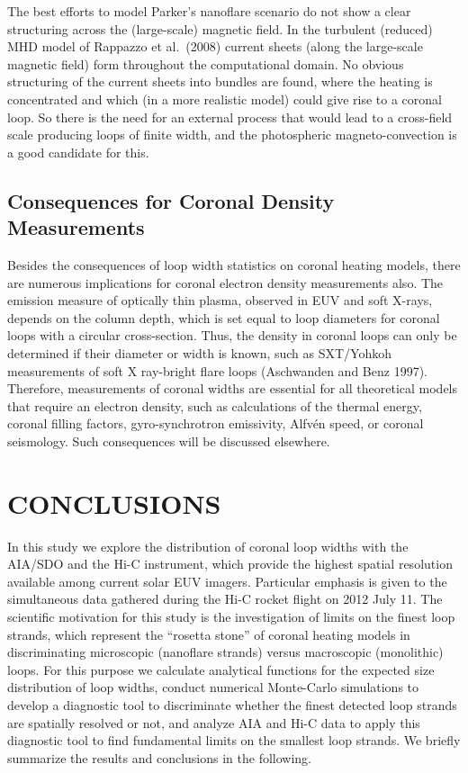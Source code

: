 \documentclass[10pt,preprint]{aastex}  %
\begin{document}
The best efforts to model Parker's nanoflare scenario do not show 
a clear structuring across the (large-scale) magnetic field. In the 
turbulent (reduced) MHD model of Rappazzo et al.~(2008) current 
sheets (along the large-scale magnetic field) form throughout 
the computational domain.  No obvious structuring of the current 
sheets into bundles are found, where the heating is concentrated 
and which (in a more realistic model) could give rise to a coronal 
loop. So there is the need for an external process that would lead 
to a cross-field scale producing loops of finite width, and the 
photospheric magneto-convection is a good candidate for this.

\subsection{	Consequences for Coronal Density Measurements 	}

Besides the consequences of loop width statistics on coronal heating
models, there are numerous implications for coronal electron density
measurements also. The emission measure of optically thin plasma, observed in
EUV and soft X-rays, depends on the column depth, which is set equal to loop
diameters for coronal loops with a circular cross-section. Thus, the density
in coronal loops can only be determined if their diameter or width is known,
such as SXT/Yohkoh measurements of soft X ray-bright flare loops 
(Aschwanden and Benz 1997).
Therefore, measurements of coronal widths are essential for all theoretical
models that require an electron density, such as
calculations of the thermal energy, coronal filling factors, 
gyro-synchrotron emissivity, Alfv\'en speed, or coronal seismology. 
Such consequences will be discussed elsewhere.

\section{	CONCLUSIONS				}

In this study we explore the distribution of coronal loop widths with 
the AIA/SDO and the Hi-C instrument, which provide the highest spatial
resolution available among current solar EUV imagers. Particular 
emphasis is given to the simultaneous data gathered during the 
Hi-C rocket flight on 2012 July 11.
The scientific motivation for this study is the investigation of limits
on the finest loop strands, which represent the ``rosetta stone'' 
of coronal heating models in discriminating microscopic (nanoflare
strands) versus macroscopic (monolithic) loops. For this purpose we
calculate analytical functions for the expected size distribution
of loop widths, conduct numerical Monte-Carlo simulations to develop
a diagnostic tool to discriminate whether the finest detected loop
strands are spatially resolved or not, and analyze AIA and Hi-C data to 
apply this diagnostic tool to find fundamental limits on the 
smallest loop strands. We briefly summarize the results and 
conclusions in the following.
\end{document}
